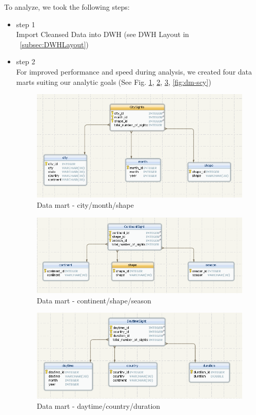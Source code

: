 \documentclass[11pt, journal]{IEEEtran}
\begin{document}
To analyze, we took the following steps:
\begin{itemize}
    \item step 1\\
    Import Cleansed Data into DWH (see DWH Layout in ~\ref{subsec:DWHLayout})
    \item step 2\\
    For improved performance and speed during analysis, we created four data marts suiting our analytic goals (See Fig. \ref{fig:dm-cms}, \ref{fig:dm-css}, \ref{fig:dm-dcd}, \ref{fig:dm-scy})
      
    \begin{figure}[htb]
        \centering
            \includegraphics[width=1.0\columnwidth]{images/city-month-shape}
        \caption{Data mart - city/month/shape}
        \label{fig:dm-cms}
    \end{figure}

     \begin{figure}[htb]
            \centering
	            \includegraphics[width=1.0\columnwidth]{images/continent-shape-season}
            \caption{Data mart - continent/shape/season}
            \label{fig:dm-css}
        \end{figure}

     \begin{figure}[htb]
        \centering
            \includegraphics[width=1.0\columnwidth]{images/daytime-country-duration}
        \caption{Data mart - daytime/country/duration}
        \label{fig:dm-dcd}
    \end{figure}


\end{itemize}
\end{document}

